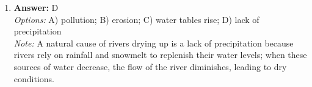 \documentclass[12pt]{article}
\begin{document}
\begin{enumerate}[label=\arabic*.]
\\ \textit{Note:} A red giant star differs from main sequence stars because it has exhausted the hydrogen fuel in its core and is now fusing helium or heavier elements, which occurs at a cooler temperature compared to the hydrogen fusion that powers main sequence stars. This lower temperature causes the star to expand and take on a reddish hue, distinguishing it from the hotter, more luminous main sequence stars.
\item \textbf{Answer:} D
\\ \textit{Options:} A) pollution; B) erosion; C) water tables rise; D) lack of precipitation
\\ \textit{Note:} A natural cause of rivers drying up is a lack of precipitation because rivers rely on rainfall and snowmelt to replenish their water levels; when these sources of water decrease, the flow of the river diminishes, leading to dry conditions.
\end{enumerate}
\end{document}

